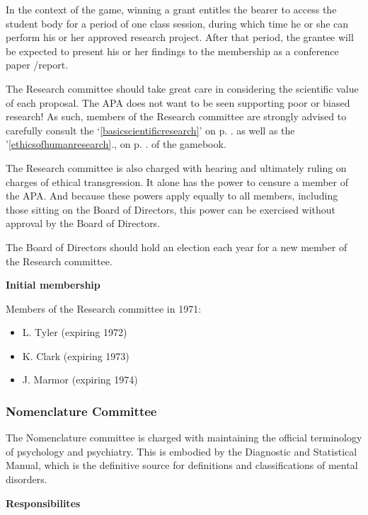 In the context of the game, winning a grant entitles the bearer to access the student body for a period of one class session, during which time he or she can perform his or her approved research project. After that period, the grantee will be expected to present his or her findings to the membership as a conference paper \slash  report.

The Research committee should take great care in considering the scientific value of each proposal. The APA does not want to be seen supporting poor or biased research! As such, members of the Research committee are strongly advised to carefully consult the `\ref{basicscientificresearch}' on p. \pageref{basicscientificresearch}. as well as the '\ref{ethicsofhumanresearch}., on p. \pageref{ethicsofhumanresearch}. of the gamebook.

The Research committee is also charged with hearing and ultimately ruling on charges of ethical transgression. It alone has the power to censure a member of the APA. And because these powers apply equally to all members, including those sitting on the Board of Directors, this power can be exercised without approval by the Board of Directors.

The Board of Directors should hold an election each year for a new member of the Research committee. 

\textbf{Initial membership}

Members of the Research committee in 1971:

\begin{itemize}
\item L. Tyler (expiring 1972)

\item K. Clark (expiring 1973)

\item J. Marmor (expiring 1974)

\end{itemize}

\subsubsection{Nomenclature Committee}
\label{nomenclaturecommittee}

The Nomenclature committee is charged with maintaining the official terminology of psychology and psychiatry. This is embodied by the Diagnostic and Statistical Manual, which is the definitive source for definitions and classifications of mental disorders. 

\textbf{Responsibilites}

